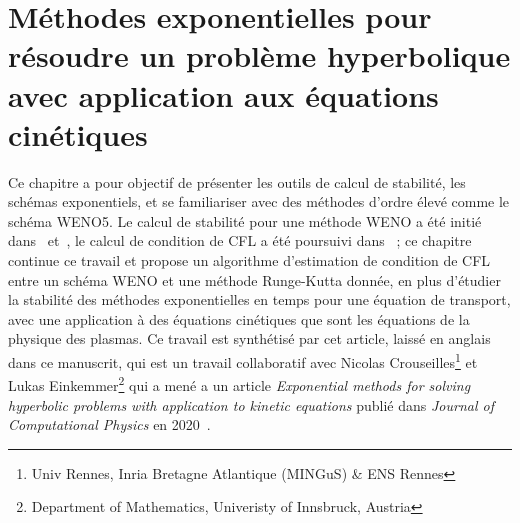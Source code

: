 \renewcommand{\localPath}{chap1}

\clearemptydoublepage
\chapter[Méthodes exponentielles appliquées aux équations cinétiques]{Méthodes exponentielles pour résoudre un problème hyperbolique avec application aux équations cinétiques}
\label{chap1}


Ce chapitre a pour objectif de présenter les outils de calcul de stabilité, les schémas exponentiels, et se familiariser avec des méthodes d'ordre élevé comme le schéma WENO5. Le calcul de stabilité pour une méthode WENO a été initié dans~\cite{Wang:2007} et~\cite{Motamed:2010}, le calcul de condition de CFL a été poursuivi dans~\cite{Lunet:2017} ; ce chapitre continue ce travail et propose un algorithme d'estimation de condition de CFL entre un schéma WENO et une méthode Runge-Kutta donnée, en plus d'étudier la stabilité des méthodes exponentielles en temps pour une équation de transport, avec une application à des équations cinétiques que sont les équations de la physique des plasmas. Ce travail est synthétisé par cet article, laissé en anglais dans ce manuscrit, qui est un travail collaboratif avec Nicolas Crouseilles\footnote{Univ Rennes, Inria Bretagne Atlantique (MINGuS) \& ENS Rennes} et Lukas Einkemmer\footnote{Department of Mathematics, Univeristy of Innsbruck, Austria} qui a mené a un article \emph{Exponential methods for solving hyperbolic problems with application to kinetic equations} publié dans \emph{Journal of Computational Physics} en 2020~\cite{Crouseilles:2019b}.

\begin{otherlanguage}{english} 

\end{otherlanguage}


